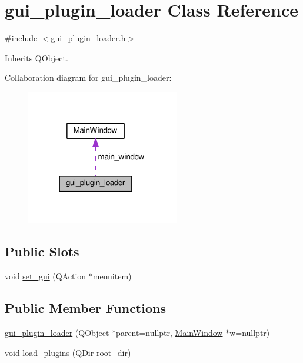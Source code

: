 \hypertarget{classgui__plugin__loader}{}\section{gui\+\_\+plugin\+\_\+loader Class Reference}
\label{classgui__plugin__loader}


{\ttfamily \#include $<$gui\+\_\+plugin\+\_\+loader.\+h$>$}



Inherits Q\+Object.



Collaboration diagram for gui\+\_\+plugin\+\_\+loader\+:\nopagebreak
\begin{figure}[H]
\begin{center}
\leavevmode
\includegraphics[width=189pt]{classgui__plugin__loader__coll__graph}
\end{center}
\end{figure}
\subsection*{Public Slots}
\begin{DoxyCompactItemize}
\item 
void \hyperlink{classgui__plugin__loader_a0d2c0ab3d2eefbc2b6dcc246ea58d43b}{set\+\_\+gui} (Q\+Action $\ast$menuitem)
\end{DoxyCompactItemize}
\subsection*{Public Member Functions}
\begin{DoxyCompactItemize}
\item 
\hyperlink{classgui__plugin__loader_a06e6c9395877425822e5f178804962f3}{gui\+\_\+plugin\+\_\+loader} (Q\+Object $\ast$parent=nullptr, \hyperlink{classMainWindow}{Main\+Window} $\ast$w=nullptr)
\item 
void \hyperlink{classgui__plugin__loader_afaea2c8da605ce9ee8e2995449a67eda}{load\+\_\+plugins} (Q\+Dir root\+\_\+dir)
\end{DoxyCompactItemize}
